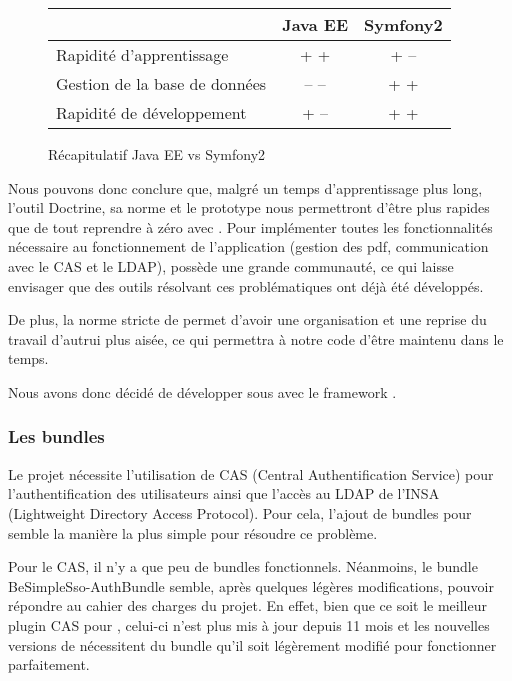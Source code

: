 \begin{figure}[H]
\begin{center}
\begin{tabular}{|l|c|c|}
	\hline
	\null & \textbf{Java EE} & \textbf{Symfony2} \\
	\hline
	Rapidité d'apprentissage & + + & + --\\
	\hline
	Gestion de la base de données & -- -- & + +\\
	\hline
	Rapidité de développement & + -- & + + \\
	\hline
\end{tabular} \vspace*{5mm}
\caption{Récapitulatif Java EE vs Symfony2}
\end{center}
\end{figure}
Nous pouvons donc conclure que, malgré un temps d'apprentissage plus long,  l'outil Doctrine, sa norme et le prototype nous permettront d'être plus rapides que de tout reprendre à zéro avec \jee.
\smallbreak
Pour implémenter toutes les fonctionnalités nécessaire au fonctionnement de l'application (gestion des pdf, communication avec le CAS et le LDAP), \symfony possède une grande communauté, ce qui laisse envisager que des outils résolvant ces problématiques ont déjà été développés.

De plus, la norme stricte de \symfony permet d'avoir une organisation et une reprise du travail d'autrui plus aisée, ce qui permettra à notre code d'être maintenu dans le temps.
\medbreak

Nous avons donc décidé de développer sous \php avec le framework \symfony.

\subsubsection{Les bundles \symfony}

Le projet nécessite l'utilisation de CAS (Central Authentification Service) pour l'authentification des utilisateurs ainsi que l'accès au LDAP de l'INSA (Lightweight Directory Access Protocol). Pour cela, l'ajout de bundles pour \symfony semble la manière la plus simple pour résoudre ce problème.

Pour le CAS, il n'y a que peu de bundles fonctionnels. Néanmoins, le bundle \og BeSimpleSso-AuthBundle \fg semble, après quelques légères modifications, pouvoir répondre au cahier des charges du projet. En effet, bien que ce soit le meilleur plugin CAS pour \symfony, celui-ci n'est plus mis à jour depuis 11 mois et les nouvelles versions de \symfony nécessitent du bundle qu'il soit légèrement modifié pour fonctionner parfaitement.

